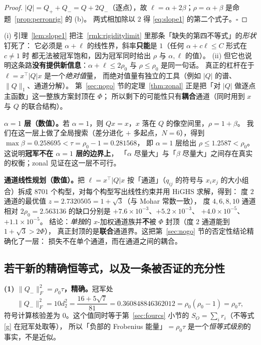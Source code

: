 \begin{proof}
$|Q|=Q_++Q_-=Q+2Q_-$（逐点），故 $\ell=\alpha+2\beta$；$\rho=\alpha+\beta$ 是命题~\ref{prop:perronrig} 的 (b)。
两式相加除以 $2$ 得 \eqref{eq:slope1} 的第二个式子。$\square$
\end{proof}

\begin{remark}\label{rmk:slope1read}
(i) 引理~\ref{lem:slope1} 把注~\ref{rmk:rigiditylimit} 里那条「缺失的第四不等式」的\emph{形状}钉死了：
它必须是 $\alpha+\ell$ 的线性界，斜率\textbf{只能}是 $1$（任何 $\alpha+c\ell\le C$ 形式在 $c\ne1$ 时
都无法被冠军饱和，因为冠军同时给出 $\rho$ 与 $\alpha,\ell$ 的值）。
(ii) 但它也说明这条路\textbf{没有提供新信息}：$\alpha+\ell\le2\rho_0$ 与 $\rho\le\rho_0$ 是同一句话。
真正的杠杆在于 $\ell=x^\top|Q|x$ 是一个\emph{绝对值}量，
而绝对值量有独立的工具（例如 $|Q|$ 的谱、$\|Q\|_1$、通道分解）。
第~\ref{sec:nogo} 节的定理~\ref{thm:zonal} 正是把「对 $|Q|$ 做逐点主函数」这一整族方案封顶在 $\Phi$；
所以剩下的可能性只有\textbf{耦合}通道（同时用到 $x$ 与 $Q$ 的联合结构）。
\end{remark}

\textbf{$\alpha=1$ 层（数值）。}若 $\alpha=1$，则 $Qx=x$，$x$ 落在 $Q$ 的像空间里，$\rho=1+\beta$。
我们在这一层上做了全局搜索（差分进化 $+$ 多起点，$N=6$），得到 $\max\beta=0.258695<\tau=\rho_0-1=0.281568$，
即 $\alpha=1$ 层给出 $\rho\le1.2587<\rho_0$。这说明\textbf{冠军不在 $\alpha=1$ 层的边界上}，
「$\alpha$ 尽量大」与「$\beta$ 尽量大」之间存在真实的权衡；zonal 见证在这一层不可行。

\textbf{通道线性规划（数值）。}把 $\ell=x^\top|Q|x$ 按「通道」（$q_{ij}$ 的符号与 $x_ix_j$ 的大小组合）拆成
$8701$ 个构型，对每个构型写出线性约束并用 HiGHS 求解，得到：
度 $2$ 通道的最优值 $z=2.7320505=1+\sqrt3$（与 Mohar 常数一致），
度 $4,6,8,10$ 通道相对 $2\rho_0=2.563136$ 的缺口分别是 $+7.6\times10^{-3}$、$+5.2\times10^{-3}$、
$+4.0\times10^{-5}$、$+1.1\times10^{-5}$。
结论：\emph{单独}的 $x$-加权通道族并\textbf{不}被 $\Phi$ 封顶（度 $2$ 通道能到 $1+\sqrt3>2\Phi$），
真正封顶的是\textbf{联合}通道界。这把第~\ref{sec:nogo} 节的否定性结论精确化了一层：
损失不在单个通道，而在通道之间的耦合。

\subsection{若干新的精确恒等式，以及一条被否证的充分性}\label{sec:miscid}

\textbf{(1) $\|Q_-\|_F^2=\rho_0\tau$，精确。}冠军处
\[
\|Q_-\|_F^2=10d_2^2=\frac{16+5\sqrt7}{81}=0.360848846362012=\rho_0(\rho_0-1)=\rho_0\tau ,
\]
符号计算核验差为 $0$。这个值同时等于第~\ref{sec:fourcs} 小节的 $S_O=\sum_ir_i$（不等式 [g] 在冠军处取等），
所以「负部的 Frobenius 能量」$=\rho_0\tau$ 是一个\emph{恒等式级别}的事实，不是近似。

